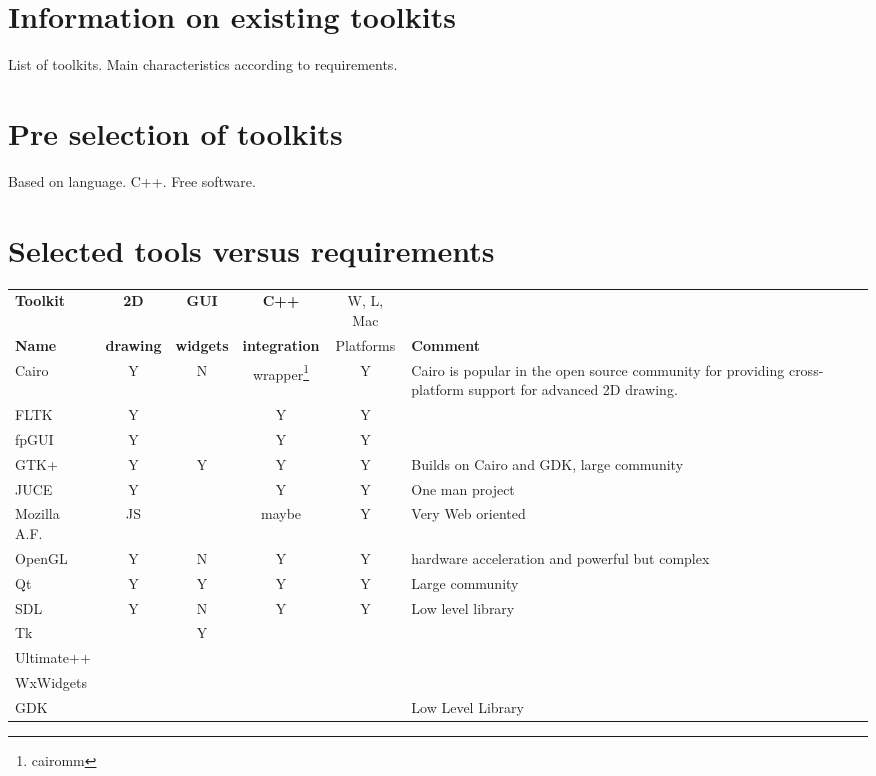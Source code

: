 \section{Information on existing toolkits}
List of toolkits. Main characteristics according to requirements.
\section{Pre selection of toolkits}
Based on language. C++. Free software.

\section{Selected tools versus requirements}

\begin{center}
    \small\sf
    \begin{tabular}{lccccp{10em}}
	\hline
        {\bf Toolkit} & {\bf 2D}      & {\bf GUI}     & {\bf C++}                 & W, L, Mac  & \\
        {\bf Name}    & {\bf drawing} & {\bf widgets} & {\bf integration}         & Platforms  & {\bf Comment}\\
        \hline
        Cairo         &   Y           &      N        & wrapper\footnote{cairomm} &    Y        & Cairo is popular in
			the open source community for providing cross-platform support for advanced 2D drawing.\\
        FLTK          &   Y           &               &   Y                       &    Y        & \\
	fpGUI         &   Y           &               &   Y                       &    Y        & \\
	GTK+	      &   Y           &      Y        &   Y                       &    Y        & Builds on Cairo and GDK, large community\\
	JUCE          &   Y           &               &   Y                       &    Y        & One man project\\
	Mozilla A.F.  &   JS          &               &   maybe			  &    Y        & Very Web oriented\\
	OpenGL        &   Y           &      N        &   Y                       &    Y        & hardware acceleration and powerful but complex\\
	Qt	      &   Y           &      Y        &   Y                       &    Y        & Large community\\
	SDL	      &   Y           &      N        &   Y                       &    Y        & Low level library\\
	Tk	      &               &      Y        &                           &             & \\
	Ultimate++    &               &               &                           &             & \\
	WxWidgets     &               &               &                           &             & \\
	GDK	      &               &               &                           &             & Low Level Library\\


\end{tabular}
\end{center}
